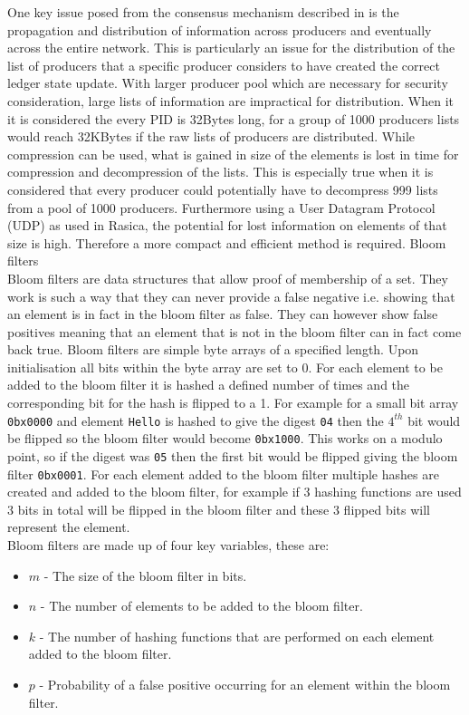 One key issue posed from the consensus mechanism described in \cite{TWP} is the propagation and distribution of information across producers and eventually across the entire network. This is particularly an issue for the distribution of the list of producers   that a specific producer considers to have created the correct ledger state update. With larger producer pool which are necessary for security consideration, large lists of information are impractical for distribution. When it it is considered the every PID is 32Bytes long, for a group of 1000 producers lists would reach 32KBytes if the raw lists of producers are distributed. While compression can be used, what is gained in size of the elements is lost in time for compression and decompression of the lists. This is especially true when it is considered that every producer could potentially have to decompress 999 lists from a pool of 1000 producers. Furthermore using a User Datagram Protocol (UDP) as used in Rasica, the potential for lost information on elements of that size is high. Therefore a more compact and efficient method is required. Bloom filters \\

Bloom filters are data structures that allow proof of membership of a set. They work is such a way that they can never provide a false negative i.e. showing that an element is in fact in the bloom filter as false. They can however show false positives meaning that an element that is not in the bloom filter can in fact come back true. Bloom filters are simple byte arrays of a specified length. Upon initialisation all bits within the byte array are set to 0. For each element to be added to the bloom filter it is hashed a defined number of times and the corresponding bit for the hash is flipped to a 1. For example for a small bit array \verb'0bx0000' and element \verb'Hello' is hashed to give the digest \verb'04' then the $4^{th}$ bit would be flipped so the bloom filter would become \verb'0bx1000'. This works on a modulo point, so if the digest was \verb'05' then the first bit would be flipped giving the bloom filter \verb'0bx0001'. For each element added to the bloom filter multiple hashes are created and added to the bloom filter, for example if 3 hashing functions are used 3 bits in total will be flipped in the bloom filter and these 3 flipped bits will represent the element. \\

Bloom filters are made up of four key variables, these are:

\begin{itemize} 
\item $m$ - The size of the bloom filter in bits.  
\item $n$ - The number of elements to be added to the bloom filter. 
\item $k$ - The number of hashing functions that are performed on each element added to the bloom filter. 
\item $p$ - Probability of a false positive occurring for an element within the bloom filter. 
\end{itemize} 

